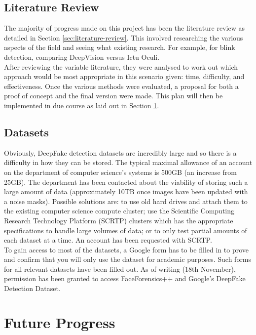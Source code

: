 \documentclass{article}
\begin{document}
\subsection{Literature Review}

The majority of progress made on this project has been the literature review as detailed in Section \ref{sec:literature-review}. This involved researching the various aspects of the field and seeing what existing research. For example, for blink detection, comparing DeepVision versus Ictu Oculi.\\

After reviewing the variable literature, they were analysed to work out which approach would be most appropriate in this scenario given: time, difficulty, and effectiveness. Once the various methods were evaluated, a proposal for both a proof of concept and the final version were made. This plan will then be implemented in due course as laid out in Section \ref{sec:future-progress}.

\subsection{Datasets} \label{sec:datasets}

Obviously, DeepFake detection datasets are incredibly large and so there is a difficulty in how they can be stored. The typical maximal allowance of an account on the department of computer science's systems is 500GB (an increase from 25GB)\cite{dcsquota}. The department has been contacted about the viability of storing such a large amount of data (approximately 10TB once images have been updated with a noise masks). Possible solutions are: to use old hard drives and attach them to the existing computer science compute cluster; use the  Scientific Computing Research Technology Platform (SCRTP) clusters which has the appropriate specifications to handle large volumes of data; or to only test partial amounts of each dataset at a time. An account has been requested with SCRTP.\\

To gain access to most of the datasets, a Google form has to be filled in to prove and confirm that you will only use the dataset for academic purposes. Such forms for all relevant datasets have been filled out. As of writing (18th November), permission has been granted to access FaceForensics++ and Google's DeepFake Detection Dataset.

\section{Future Progress} \label{sec:future-progress}
\end{document}

